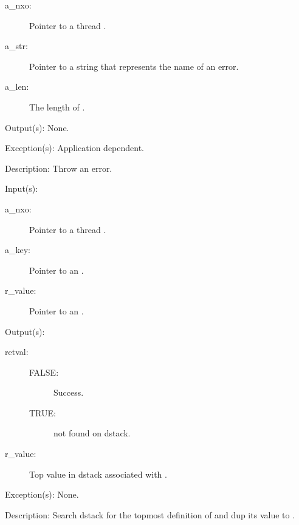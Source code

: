 \begin{capi}
\begin{capilist}
\begin{description}
		\item[a\_nxo: ]
			Pointer to a thread .
		\item[a\_str: ]
			Pointer to a string that represents the name of an
			error.
		\item[a\_len: ]
			The length of .
		\end{description}
	\item[Output(s): ] None.
	\item[Exception(s): ] Application dependent.
	\item[Description: ]
		Throw an error.
	\end{capilist}
\label{nxo_thread_dstack_search}
	\begin{capilist}
	\item[Input(s): ]
		\begin{description}\item[]
		\item[a\_nxo: ]
			Pointer to a thread .
		\item[a\_key: ]
			Pointer to an .
		\item[r\_value: ]
			Pointer to an .
		\end{description}
	\item[Output(s): ]
		\begin{description}\item[]
		\item[retval: ]
			\begin{description}\item[]
			\item[FALSE: ]
				Success.
			\item[TRUE: ]
				 not found on dstack.
			\end{description}
		\item[r\_value: ]
			Top value in dstack associated with .
		\end{description}
	\item[Exception(s): ] None.
	\item[Description: ]
		Search dstack for the topmost definition of  and
		dup its value to .
	\end{capilist}
\label{nxo_thread_currentlocking}
\end{capi}
